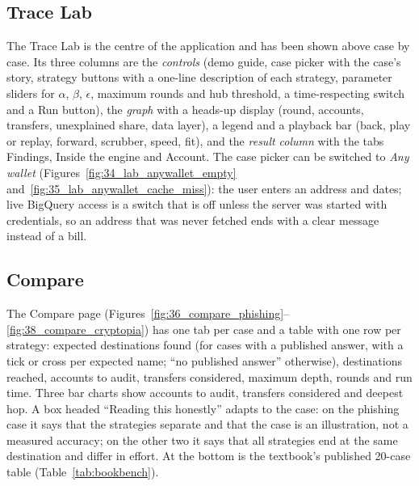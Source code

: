 
\subsection{Trace Lab}
The Trace Lab is the centre of the application and has been shown above case by case. Its three columns are the \emph{controls} (demo guide, case picker with the case's story, strategy buttons with a one-line description of each strategy, parameter sliders for $\alpha$, $\beta$, $\epsilon$, maximum rounds and hub threshold, a time-respecting switch and a Run button), the \emph{graph} with a heads-up display (round, accounts, transfers, unexplained share, data layer), a legend and a playback bar (back, play or replay, forward, scrubber, speed, fit), and the \emph{result column} with the tabs Findings, Inside the engine and Account. The case picker can be switched to \emph{Any wallet} (Figures~\ref{fig:34_lab_anywallet_empty} and~\ref{fig:35_lab_anywallet_cache_miss}): the user enters an address and dates; live BigQuery access is a switch that is off unless the server was started with credentials, so an address that was never fetched ends with a clear message instead of a bill.


\subsection{Compare}
The Compare page (Figures~\ref{fig:36_compare_phishing}--\ref{fig:38_compare_cryptopia}) has one tab per case and a table with one row per strategy: expected destinations found (for cases with a published answer, with a tick or cross per expected name; ``no published answer'' otherwise), destinations reached, accounts to audit, transfers considered, maximum depth, rounds and run time. Three bar charts show accounts to audit, transfers considered and deepest hop. A box headed ``Reading this honestly'' adapts to the case: on the phishing case it says that the strategies separate and that the case is an illustration, not a measured accuracy; on the other two it says that all strategies end at the same destination and differ in effort. At the bottom is the textbook's published 20-case table (Table~\ref{tab:bookbench}).

